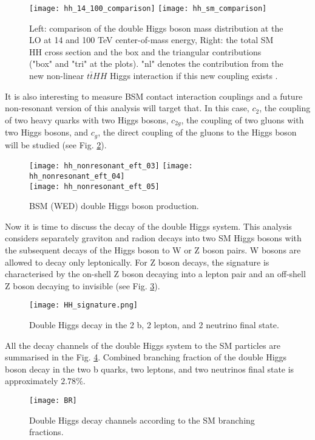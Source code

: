 \begin{figure}[H]
  \centering 
    \texttt{[image: hh\_14\_100\_comparison]}
    \texttt{[image: hh\_sm\_comparison]}
    \caption{Left: comparison of the double Higgs boson mass distribution at the LO at 14 and 100 TeV center-of-mass energy, Right: the total SM HH cross section and the box and the triangular contributions ("box" and "tri" at the plots). "nl" denotes the contribution from the new non-linear $t\bar{t}HH$ Higgs interaction if this new coupling exists \cite{Contino:2012xk}. }
    \label{hh_comparison}
\end{figure}


It is also interesting to measure BSM contact interaction couplings and a future non-resonant version of this analysis will target that. In this case, $c_2$, the coupling of two heavy quarks with two Higgs bosons, $c_{2g}$, the coupling of two gluons with two Higgs bosons, and $c_g$, the direct coupling of the gluons to the Higgs boson will be studied (see Fig. \ref{BSM_HH}). 

\begin{figure}[H]
  \centering
    \texttt{[image: hh\_nonresonant\_eft\_03]}
    \texttt{[image: hh\_nonresonant\_eft\_04]}\\
     \texttt{[image: hh\_nonresonant\_eft\_05]}
    \caption{BSM (WED) double Higgs boson production.}
    \label{BSM_HH}
\end{figure}


Now it is time to discuss the decay of the double Higgs system. 
This analysis considers separately graviton and radion decays into two SM Higgs bosons with the subsequent decays of the Higgs boson to W or Z boson pairs. W bosons are allowed to decay only leptonically. For Z boson decays, the signature is characterised by the on-shell Z boson decaying into a lepton pair and an off-shell Z boson decaying to invisible (see Fig. \ref{HH_signature}). 

\begin{figure}[H]
  \centering
    \texttt{[image: HH\_signature.png]}
    \caption{Double Higgs decay in the 2 b, 2 lepton, and 2 neutrino final state. }
    \label{HH_signature}
\end{figure}

All the decay channels of the double Higgs system to the SM particles are summarised in the Fig. \ref{BR}. Combined branching fraction of the double Higgs boson decay in the two b quarks, two leptons, and two neutrinos final state is approximately $2.78 \%$. 

\begin{figure}[H]
  \centering
    \texttt{[image: BR]}
    \caption{Double Higgs decay channels according to the SM branching fractions.}
    \label{BR}
\end{figure}




